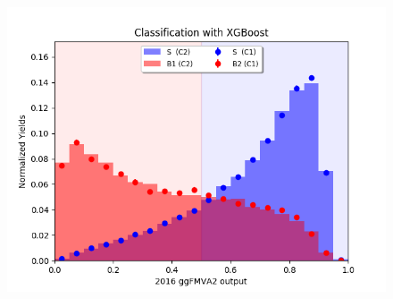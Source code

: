 \begin{figure}[ht!]
\begin{center}
{\includegraphics[width=0.43\linewidth]{Figures/AnalysisStrategy/signalobservables/ggfcomparisons/2016/ggfmva2_2016MVA2B1VS2016MVA2B2_score_output.png}}\\
\end{center}
\end{figure}

